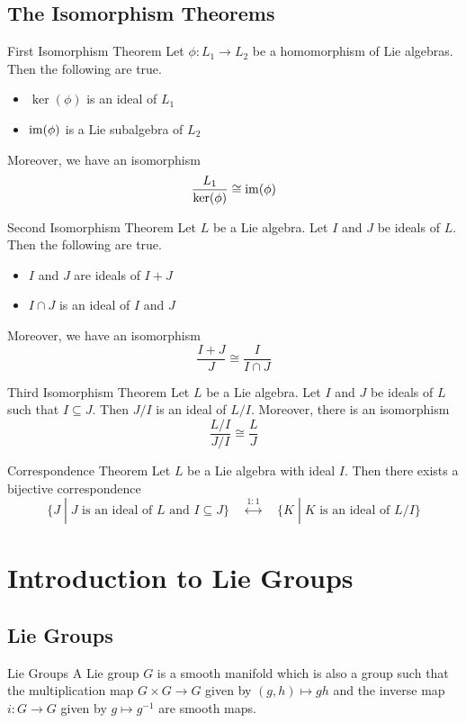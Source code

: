 \documentclass[a4paper]{article}
\begin{document}
\subsection{The Isomorphism Theorems}
\begin{thm}{First Isomorphism Theorem}{} Let $\phi:L_1\to L_2$ be a homomorphism of Lie algebras. Then the following are true. 
\begin{itemize}
\item $\ker(\phi)$ is an ideal of $L_1$
\item $\operatorname{im}(\phi)$ is a Lie subalgebra of $L_2$
\end{itemize}
Moreover, we have an isomorphism $$\frac{L_1}{\ker(\phi)}\cong\operatorname{im}(\phi)$$
\end{thm}

\begin{thm}{Second Isomorphism Theorem}{} Let $L$ be a Lie algebra. Let $I$ and $J$ be ideals of $L$. Then the following are true. 
\begin{itemize}
\item $I$ and $J$ are ideals of $I+J$
\item $I\cap J$ is an ideal of $I$ and $J$
\end{itemize}
Moreover, we have an isomorphism $$\frac{I+J}{J}\cong\frac{I}{I\cap J}$$
\end{thm}

\begin{thm}{Third Isomorphism Theorem}{} Let $L$ be a Lie algebra. Let $I$ and $J$ be ideals of $L$ such that $I\subseteq J$. Then $J/I$ is an ideal of $L/I$. Moreover, there is an isomorphism $$\frac{L/I}{J/I}\cong\frac{L}{J}$$
\end{thm}

\begin{thm}{Correspondence Theorem}{} Let $L$ be a Lie algebra with ideal $I$. Then there exists a bijective correspondence $$\{J\;|\;J\text{ is an ideal of }L\text{ and }I\subseteq J\}\;\;\;\;\overset{1:1}{\longleftrightarrow}\;\;\;\;\{K\;|\;K\text{ is an ideal of }L/I\}$$
\end{thm}

\pagebreak
\section{Introduction to Lie Groups}
\subsection{Lie Groups}
\begin{defn}{Lie Groups}{} A Lie group $G$ is a smooth manifold which is also a group such that the multiplication map $G\times G\to G$ given by $(g,h)\mapsto gh$ and the inverse map $i:G\to G$ given by $g\mapsto g^{-1}$ are smooth maps. 
\end{defn}
\end{document}
